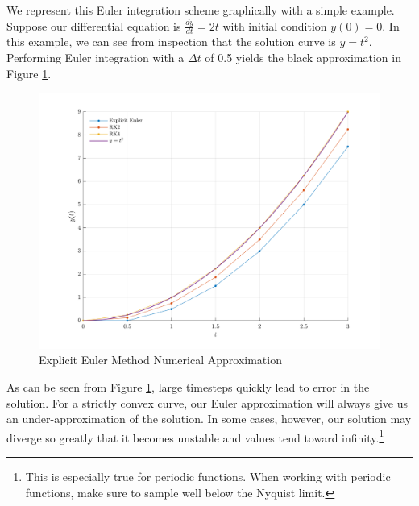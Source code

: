 \documentclass[12pt]{report}
\begin{document}
We represent this Euler integration scheme graphically with a simple example. Suppose our differential equation is $\frac{dy}{dt}=2t$ with initial condition $y(0)=0$. In this example, we can see from inspection that the solution curve is $y=t^2$. Performing Euler integration with a $\Delta t$ of 0.5 yields the black approximation in Figure \ref{fig:Euler}.
\begin{figure}[ht]
    \centering
    
\includegraphics[width=\linewidth]{6DoF Explanation Scripts/Explicit Euler Approximation Figure.png}
    \caption{Explicit Euler Method Numerical Approximation}
    \label{fig:Euler}
\end{figure}

As can be seen from Figure \ref{fig:Euler}, large timesteps quickly lead to error in the solution. For a strictly convex curve, our Euler approximation will always give us an under-approximation of the solution. In some cases, however, our solution may diverge so greatly that it becomes unstable and values tend toward infinity.\footnote{This is especially true for periodic functions. When working with periodic functions, make sure to sample well below the Nyquist limit.}
 
\end{document}

